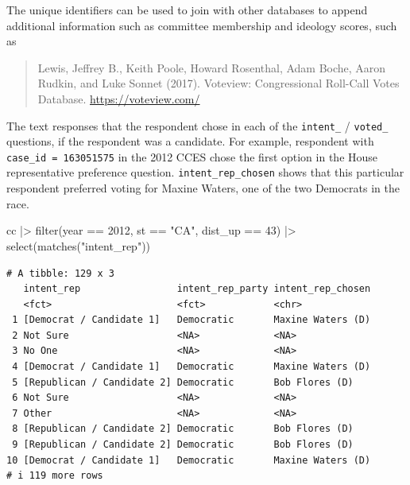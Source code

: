 \documentclass[10pt,article,oneside]{memoir}
\theoremstyle{definition}
\newenvironment{Shaded}{\begin{snugshade}}{\end{snugshade}}
\newcommand{\DecValTok}[1]{\textcolor[rgb]{0.68,0.00,0.00}{#1}}
\newcommand{\FunctionTok}[1]{\textcolor[rgb]{0.28,0.35,0.67}{#1}}
\newcommand{\NormalTok}[1]{\textcolor[rgb]{0.00,0.23,0.31}{#1}}
\newcommand{\SpecialCharTok}[1]{\textcolor[rgb]{0.37,0.37,0.37}{#1}}
\newcommand{\StringTok}[1]{\textcolor[rgb]{0.13,0.47,0.30}{#1}}
\begin{document}
The unique identifiers can be used to join with other databases to
append additional information such as committee membership and ideology
scores, such as

\begin{quote}
Lewis, Jeffrey B., Keith Poole, Howard Rosenthal, Adam Boche, Aaron
Rudkin, and Luke Sonnet (2017). Voteview: Congressional Roll-Call Votes
Database. \url{https://voteview.com/}
\end{quote}

The text responses that the respondent chose in each of the
\texttt{intent\_} / \texttt{voted\_} questions, if the respondent was a
candidate. For example, respondent with \texttt{case\_id\ =\ 163051575}
in the 2012 CCES chose the first option in the House representative
preference question. \texttt{intent\_rep\_chosen} shows that this
particular respondent preferred voting for Maxine Waters, one of the two
Democrats in the race.

\begin{Shaded}
\begin{Highlighting}[]
\NormalTok{cc }\SpecialCharTok{|\textgreater{}} 
  \FunctionTok{filter}\NormalTok{(year }\SpecialCharTok{==} \DecValTok{2012}\NormalTok{, st }\SpecialCharTok{==} \StringTok{"CA"}\NormalTok{, dist\_up }\SpecialCharTok{==} \DecValTok{43}\NormalTok{) }\SpecialCharTok{|\textgreater{}} 
  \FunctionTok{select}\NormalTok{(}\FunctionTok{matches}\NormalTok{(}\StringTok{"intent\_rep"}\NormalTok{)) }
\end{Highlighting}
\end{Shaded}

\begin{verbatim}
# A tibble: 129 x 3
   intent_rep                 intent_rep_party intent_rep_chosen
   <fct>                      <fct>            <chr>            
 1 [Democrat / Candidate 1]   Democratic       Maxine Waters (D)
 2 Not Sure                   <NA>             <NA>             
 3 No One                     <NA>             <NA>             
 4 [Democrat / Candidate 1]   Democratic       Maxine Waters (D)
 5 [Republican / Candidate 2] Democratic       Bob Flores (D)   
 6 Not Sure                   <NA>             <NA>             
 7 Other                      <NA>             <NA>             
 8 [Republican / Candidate 2] Democratic       Bob Flores (D)   
 9 [Republican / Candidate 2] Democratic       Bob Flores (D)   
10 [Democrat / Candidate 1]   Democratic       Maxine Waters (D)
# i 119 more rows
\end{verbatim}
\end{document}
